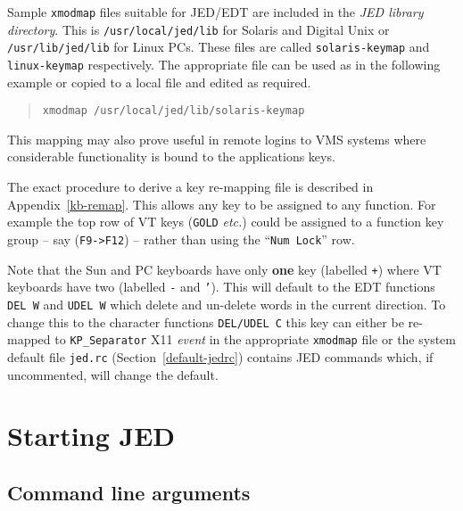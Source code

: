 \documentclass[twoside,11pt]{article}
\newcommand{\xlabel}[1]{}
\begin{document}
Sample \texttt{xmodmap} files suitable for JED/EDT are included in the
\textit{JED library directory}. This is \texttt{/usr/local/jed/lib} for
Solaris and Digital Unix or \texttt{/usr/lib/jed/lib} for Linux PCs.
These files are called \texttt{solaris-keymap} and
\texttt{linux-keymap} respectively. The appropriate file can be used as
in the following example or copied to a local file and edited as
required.

\begin{quote}
\begin{verbatim}
xmodmap /usr/local/jed/lib/solaris-keymap
\end{verbatim}
\end{quote}

This mapping may also prove useful in remote logins to VMS systems
where considerable functionality is bound to the applications keys.

The exact procedure to derive a key re-mapping file is described in
Appendix~{\ref{kb-remap}}. This allows any
key to be assigned to any function. For example the top row of VT keys
(\texttt{GOLD} \textit{etc.}) could be assigned  to a function key group --
say (\texttt{F9->F12}) -- rather than using the
``\texttt{Num Lock}'' row.

Note that the Sun and PC keyboards have only \textbf{one} key (labelled
\texttt{+}) where VT keyboards have two (labelled \texttt{-} and
\texttt{'}). This will default to the EDT
functions \texttt{DEL~W} and \texttt{UDEL~W} which delete and un-delete
words in the current direction. To change this to the character
functions \texttt{DEL/UDEL~C} this key can either be re-mapped to
\texttt{KP\_Separator} X11 \textit{event} in the appropriate
\texttt{xmodmap} file or
the system default file \texttt{jed.rc} (Section~{\ref{default-jedrc}})
contains JED commands which, if uncommented, will change the default.

\section{\xlabel{starting_jed}Starting JED}
\label{starting_jed}

\subsection{\xlabel{command_line_arguments}Command line arguments}
\label{command_line_arguments}
\label{cl-switches}
\end{document}
